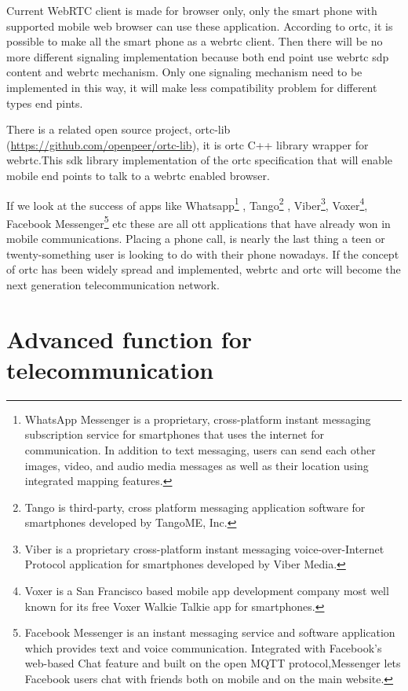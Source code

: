 \par Current WebRTC client is made for browser only, only the smart phone with supported mobile web browser can use these application. According to \gls{ortc}, it is possible to make all the smart phone as a \gls{webrtc} client. Then there will be no more different signaling implementation because both end point use \gls{webrtc} \gls{sdp} content and \gls{webrtc} mechanism. Only one signaling mechanism need to be implemented in this way, it will make less compatibility problem for different types end pints.

\par There is a related open source project, ortc-lib (\url{https://github.com/openpeer/ortc-lib}), it is \gls{ortc} C++ library wrapper for \gls{webrtc}.This \gls{sdk} library implementation of the \gls{ortc} specification that will enable mobile end points to talk to a \gls{webrtc} enabled browser.

\par If we look at the success of apps like Whatsapp\footnote{WhatsApp Messenger is a proprietary, cross-platform instant messaging subscription service for smartphones that uses the internet for communication. In addition to text messaging, users can send each other images, video, and audio media messages as well as their location using integrated mapping features.} , Tango\footnote{Tango is third-party, cross platform messaging application software for smartphones developed by TangoME, Inc.} , Viber\footnote{Viber is a proprietary cross-platform instant messaging voice-over-Internet Protocol application for smartphones developed by Viber Media.}, Voxer\footnote{Voxer is a San Francisco based mobile app development company most well known for its free Voxer Walkie Talkie app for smartphones.}, Facebook Messenger\footnote{Facebook Messenger is an instant messaging service and software application which provides text and voice communication. Integrated with Facebook's web-based Chat feature and built on the open MQTT protocol,Messenger lets Facebook users chat with friends both on mobile and on the main website.} etc these are all \gls{ott} applications that have already won in mobile communications. Placing a phone call, is nearly the last thing a teen or twenty-something user is looking to do with their phone nowadays.\cite{web:ott_com} If the concept of \gls{ortc} has been widely spread and implemented, \gls{webrtc} and \gls{ortc} will become the next generation telecommunication network.

\section{Advanced function for telecommunication}

